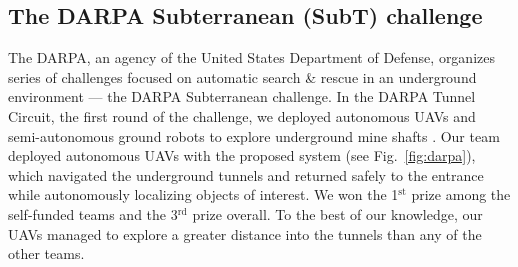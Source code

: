 \documentclass[a4paper,11pt,titlepage,twoside]{book}
\newcommand{\reffig}[1]{Fig.~\ref{#1}}
\begin{document}
  \subsection{The DARPA Subterranean (SubT) challenge}

  The \ac{DARPA}, an agency of the United States Department of Defense, organizes series of challenges focused on automatic search \& rescue in an underground environment --- the \ac{DARPA} Subterranean challenge.
  In the \ac{DARPA} Tunnel Circuit, the first round of the challenge, we deployed autonomous \acp{UAV} and semi-autonomous ground robots to explore underground mine shafts \cite{petrlik2020robust, roucek2019darpa}.
  Our team deployed autonomous \acp{UAV} with the proposed system (see \reffig{fig:darpa}), which navigated the underground tunnels and returned safely to the entrance while autonomously localizing objects of interest.
  We won the 1$^{\mathrm{st}}$ prize among the self-funded teams and the 3$^{\mathrm{rd}}$ prize overall.
  To the best of our knowledge, our \acp{UAV} managed to explore a greater distance into the tunnels than any of the other teams.
\end{document}
